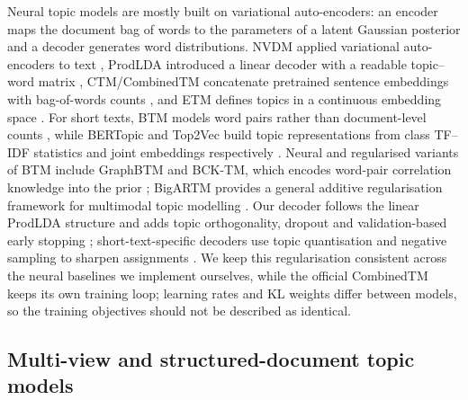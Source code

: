 \documentclass[Journal,letterpaper]{ascelike-new}
\begin{document}
Neural topic models are mostly built on variational auto-encoders: an encoder maps the document
bag of words to the parameters of a latent Gaussian posterior and a decoder generates word
distributions. NVDM applied variational auto-encoders to text \cite{miao2016nvdm}, ProdLDA
introduced a linear decoder with a readable topic--word matrix \cite{srivastava2017avitm},
CTM/CombinedTM concatenate pretrained sentence embeddings with bag-of-words counts
\cite{bianchi2021ctm}, and ETM defines topics in a continuous embedding space \cite{dieng2020etm}.
For short texts, BTM models word pairs rather than document-level counts \cite{yan2013btm}, while
BERTopic and Top2Vec build topic representations from class TF--IDF statistics and joint embeddings
respectively \cite{grootendorst2022bertopic,angelov2020top2vec}. Neural and regularised variants of
BTM include GraphBTM \cite{zhu2018graphbtm} and BCK-TM, which encodes word-pair correlation
knowledge into the prior \cite{zhang2020bcktm}; BigARTM provides a general additive regularisation
framework for multimodal topic modelling \cite{vorontsov2015bigartm}. Our decoder follows the linear
ProdLDA structure and adds topic orthogonality, dropout \cite{srivastava2014dropout} and
validation-based early stopping \cite{prechelt1998early}; short-text-specific decoders use topic
quantisation and negative sampling to sharpen assignments \cite{quantization2020}. We keep this
regularisation consistent across the neural baselines we implement ourselves, while the official
CombinedTM keeps its own training loop; learning rates and KL weights differ between models, so the
training objectives should not be described as identical.

\subsection{Multi-view and structured-document topic models}
\end{document}
